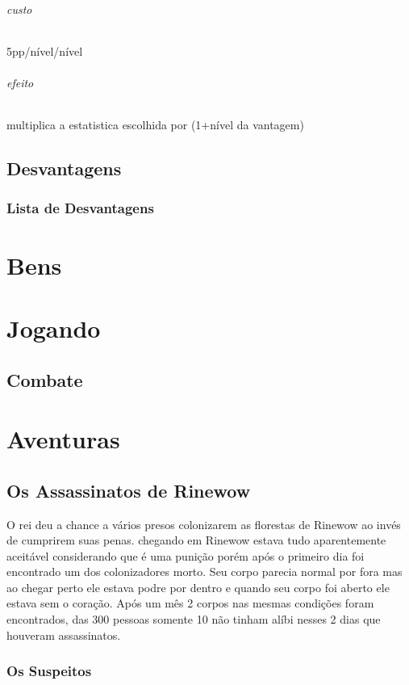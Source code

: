 \paragraph{custo} 5pp/nível/nível
\paragraph{efeito} multiplica a estatistica escolhida por (1+nível da vantagem)
%
%
%
%
\chapter{Desvantagens}
\section{Lista de Desvantagens}
%
%
%
%
%
%
%
\part{Bens}
%
%
%
%
\part{Jogando}
\chapter{Combate}
%
%
%
%
\part{Aventuras}
\chapter{Os Assassinatos de Rinewow}
O rei deu a chance a vários presos colonizarem as florestas de Rinewow
ao invés de cumprirem suas penas.
chegando em Rinewow estava tudo aparentemente aceitável considerando que é uma punição
porém após o primeiro dia foi encontrado um dos colonizadores morto.
Seu corpo parecia normal por fora mas ao chegar perto ele estava podre por dentro e quando seu corpo foi aberto ele estava sem o coração.
Após um mês 2 corpos nas mesmas condições foram encontrados,
das 300 pessoas somente 10 não tinham alíbi
nesses 2 dias que houveram assassinatos.
%
\section{Os Suspeitos}
